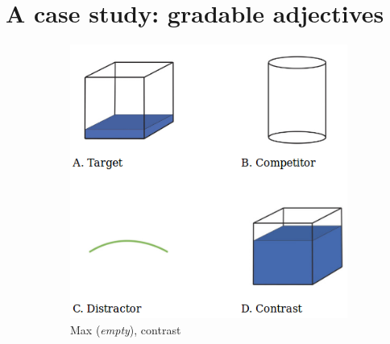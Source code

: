 \documentclass[10pt,letterpaper]{article}
\begin{document}
\vspace{-2ex}

\section{A case study: gradable adjectives}

\begin{figure}[ht]
  \centering
  \begin{subfigure}[b]{0.2\textwidth}
    \includegraphics[width=\textwidth]{plots/scene15c.png}
    \caption{Max (\emph{empty}), contrast}
    \label{fig:maxcontrast}
  \end{subfigure}
  \qquad
  ~ %
  \begin{subfigure}[b]{0.2\textwidth}

\end{subfigure}
\end{figure}
\end{document}
